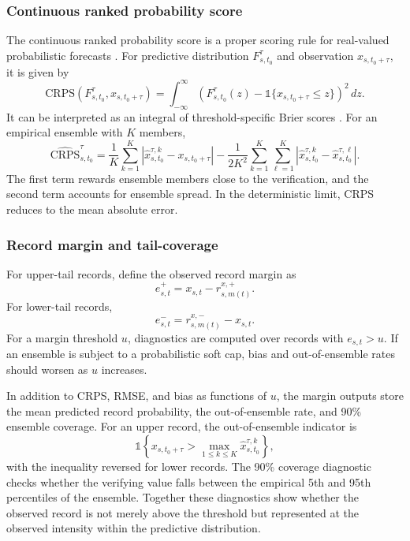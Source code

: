 \documentclass[11pt]{article}
\begin{document}
\subsubsection{Continuous ranked probability score}

The continuous ranked probability score is a proper scoring rule for real-valued probabilistic forecasts \citep{gneiting2007strictly, jordan2019scoringrules}. For predictive distribution $F^{\tau}_{s,t_0}$ and observation $x_{s,t_0+\tau}$, it is given by
\begin{equation}
    \mathrm{CRPS}\left(F^{\tau}_{s,t_0}, x_{s,t_0+\tau}\right)
    = \int_{-\infty}^{\infty}\left(F^{\tau}_{s,t_0}(z)-\mathbb{1}\{x_{s,t_0+\tau}\le z\}\right)^2\,dz.
    \label{eq:crpscdf}
\end{equation}
It can be interpreted as an integral of threshold-specific Brier scores \citep{hersbach2000crps}. For an empirical ensemble with $K$ members,
\begin{equation}
    \widehat{\mathrm{CRPS}}_{s,t_0}^{\tau}
    = \frac{1}{K}\sum_{k=1}^{K}\left|\hat{x}^{\tau,k}_{s,t_0}-x_{s,t_0+\tau}\right|
    - \frac{1}{2K^2}\sum_{k=1}^{K}\sum_{\ell=1}^{K}
    \left|\hat{x}^{\tau,k}_{s,t_0}-\hat{x}^{\tau,\ell}_{s,t_0}\right|.
    \label{eq:crpsempirical}
\end{equation}
The first term rewards ensemble members close to the verification, and the second term accounts for ensemble spread. In the deterministic limit, CRPS reduces to the mean absolute error. 

\subsubsection{Record margin and tail-coverage}

For upper-tail records, define the observed record margin as
\begin{equation}
    e^{+}_{s,t}=x_{s,t}-r^{x,+}_{s,m(t)}.
    \label{eq:marginupper}
\end{equation}
For lower-tail records,
\begin{equation}
    e^{-}_{s,t}=r^{x,-}_{s,m(t)}-x_{s,t}.
    \label{eq:marginlower}
\end{equation}
For a margin threshold $u$, diagnostics are computed over records with $e_{s,t}>u$. If an ensemble is subject to a probabilistic soft cap, bias and out-of-ensemble rates should worsen as $u$ increases.

In addition to CRPS, RMSE, and bias as functions of $u$, the margin outputs store the mean predicted record probability, the out-of-ensemble rate, and 90\% ensemble coverage. For an upper record, the out-of-ensemble indicator is
\begin{equation}
    \mathbb{1}\left\{x_{s,t_0+\tau} > \max_{1\le k\le K}\hat{x}^{\tau,k}_{s,t_0}\right\},
\end{equation}
with the inequality reversed for lower records. The 90\% coverage diagnostic checks whether the verifying value falls between the empirical 5th and 95th percentiles of the ensemble. Together these diagnostics show whether the observed record is not merely above the threshold but represented at the observed intensity within the predictive distribution.
\end{document}
